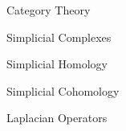 \documentclass[../main.tex]{subfiles}
\begin{document}
    \begin{section}{Category Theory}
           
    \end{section}
    \newpage
    \begin{section}{Simplicial Complexes} 
            
    \end{section}
    \newpage
    \begin{section}{Simplicial Homology}
            
    \end{section}
    \newpage
    \begin{section}{Simplicial Cohomology}
         
    \end{section}
    \newpage
    \begin{section}{Laplacian Operators}
        
    \end{section}
\end{document}
